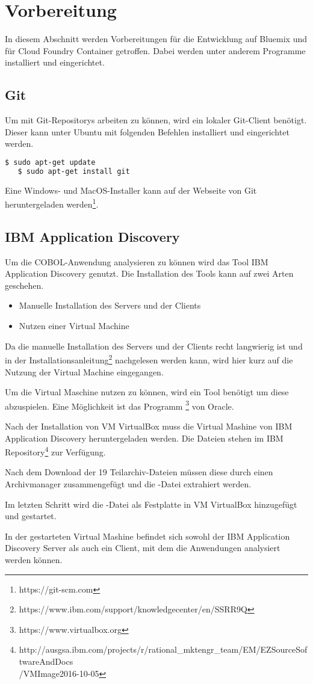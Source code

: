 \section{Vorbereitung}
In diesem Abschnitt werden Vorbereitungen für die Entwicklung auf Bluemix und für Cloud Foundry Container getroffen. Dabei
werden unter anderem Programme installiert und eingerichtet.

\subsection{Git}
Um mit Git-Repositorys arbeiten zu können, wird ein lokaler Git-Client benötigt. Dieser kann unter Ubuntu mit folgenden Befehlen
installiert und eingerichtet werden.

\begin{lstlisting}[language=bash, caption=Installieren von Git, label=Installieren von Git]
   $ sudo apt-get update
   $ sudo apt-get install git
\end{lstlisting}

Eine Windows- und MacOS-Installer kann auf der Webseite von Git heruntergeladen werden\footnote{https://git-scm.com}.

\subsection{IBM Application Discovery}
Um die COBOL-Anwendung analysieren zu können wird das Tool IBM Application Discovery genutzt. Die Installation des Tools
kann auf zwei Arten geschehen.

\begin{itemize}
    \item{Manuelle Installation des Servers und der Clients}
    \item{Nutzen einer Virtual Machine}
\end{itemize}

Da die manuelle Installation des Servers und der Clients recht langwierig ist und in der
Installationsanleitung\footnote{https://www.ibm.com/support/knowledgecenter/en/SSRR9Q} nachgelesen werden kann, wird hier
kurz auf die Nutzung der Virtual Machine eingegangen.

Um die Virtual Maschine nutzen zu können, wird ein Tool benötigt um diese abzuspielen. Eine Möglichkeit ist das Programm
\footnote{https://www.virtualbox.org} von Oracle.

Nach der Installation von VM VirtualBox muss die Virtual Mashine von IBM Application Discovery heruntergeladen werden.
Die Dateien stehen im IBM
Repository\footnote{http://ausgsa.ibm.com/projects/r/rational\_mktengr\_team/EM/EZSourceSoftwareAndDocs\\/VMImage2016-10-05}
zur Verfügung.

Nach dem Download der 19 Teilarchiv-Dateien müssen diese durch einen Archivmanager zusammengefügt und die -Datei
extrahiert werden.

Im letzten Schritt wird die -Datei als Festplatte in VM VirtualBox hinzugefügt und gestartet.

In der gestarteten Virtual Mashine befindet sich sowohl der IBM Application Discovery Server als auch ein Client, mit dem
die Anwendungen analysiert werden können.